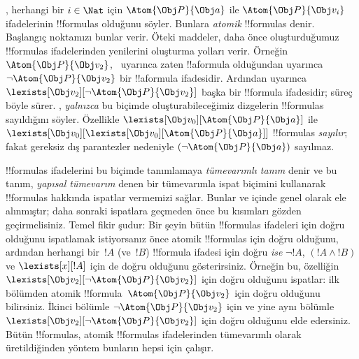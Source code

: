 , herhangi bir $i\in\Nat$ için
$\Atom{\Obj P}{\Obj a}$ ile $\Atom{\Obj P}{\Obj v_i}$ ifadelerinin
!!{formula}s olduğunu söyler. Bunlara \emph{atomik} !!{formula}s
denir. Başlangıç noktamızı bunlar verir. Öteki maddeler, daha önce
oluşturduğumuz !!{formula}s ifadelerinden yenilerini oluşturma yolları
verir. Örneğin $\Atom{\Obj P}{\Obj v_2}$,~ uyarınca
zaten !!a{formula} olduğundan  uyarınca
$\lnot\Atom{\Obj P}{\Obj v_2}$ bir !!a{formula} ifadesidir. Ardından
 uyarınca
$\lexists[\Obj v_2][\lnot\Atom{\Obj P}{\Obj v_2}]$ başka bir
!!{formula} ifadesidir; süreç böyle sürer. , \emph{yalnızca}
bu biçimde oluşturabileceğimiz dizgelerin !!{formula}s sayıldığını
söyler. Özellikle $\lexists[\Obj v_0][\Atom{\Obj P}{\Obj a}]$ ile
$\lexists[\Obj v_0][\lexists[\Obj v_0][\Atom{\Obj P}{\Obj a}]]$
!!{formula}s \emph{sayılır}; fakat gereksiz dış parantezler nedeniyle
$(\lnot\Atom{\Obj P}{\Obj a})$ sayılmaz.

!!{formula}s ifadelerini bu biçimde tanımlamaya \emph{tümevarımlı
tanım} denir ve bu tanım, \emph{yapısal tümevarım} denen bir tümevarımla
ispat biçimini kullanarak !!{formula}s hakkında ispatlar vermemizi
sağlar. Bunlar  ve
 içinde genel olarak ele alınmıştır; daha
sonraki ispatlara geçmeden önce bu kısımları gözden geçirmelisiniz.
Temel fikir şudur: Bir şeyin bütün !!{formula}s ifadeleri için doğru
olduğunu ispatlamak istiyorsanız önce atomik !!{formula}s için doğru
olduğunu, ardından herhangi bir~$!A$ (ve~$!B$) !!{formula} ifadesi
için doğru \emph{ise} $\lnot !A$, $(!A\land !B)$ ve
$\lexists[x][!A]$ için de doğru olduğunu gösterirsiniz. Örneğin bu,
özelliğin $\lexists[\Obj v_2][\lnot\Atom{\Obj P}{\Obj v_2}]$ için
doğru olduğunu ispatlar: ilk bölümden atomik
!!{formula}~$\Atom{\Obj P}{\Obj v_2}$ için doğru olduğunu bilirsiniz.
İkinci bölümle $\lnot\Atom{\Obj P}{\Obj v_2}$ için ve yine aynı
bölümle $\lexists[\Obj v_2][\lnot\Atom{\Obj P}{\Obj v_2}]$ için doğru
olduğunu elde edersiniz. Bütün !!{formula}s, atomik !!{formula}s
ifadelerinden tümevarımlı olarak üretildiğinden yöntem bunların hepsi
için çalışır.

